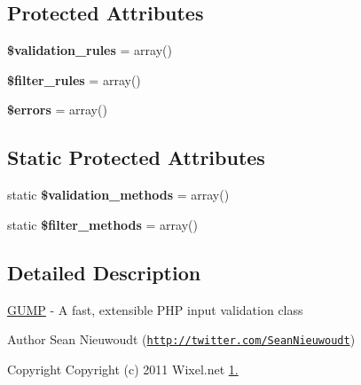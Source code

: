 \subsection*{Protected Attributes}
\begin{DoxyCompactItemize}
\item 
\hypertarget{class_g_u_m_p_abd46aadb9310cf380929cc59082e09c8}{{\bfseries \$validation\-\_\-rules} = array()}\label{class_g_u_m_p_abd46aadb9310cf380929cc59082e09c8}

\item 
\hypertarget{class_g_u_m_p_abaadef9a387318e61f818d346abc5f96}{{\bfseries \$filter\-\_\-rules} = array()}\label{class_g_u_m_p_abaadef9a387318e61f818d346abc5f96}

\item 
\hypertarget{class_g_u_m_p_ab24faf4aa647cdcee494fc48524ad4ff}{{\bfseries \$errors} = array()}\label{class_g_u_m_p_ab24faf4aa647cdcee494fc48524ad4ff}

\end{DoxyCompactItemize}
\subsection*{Static Protected Attributes}
\begin{DoxyCompactItemize}
\item 
\hypertarget{class_g_u_m_p_aa52e18a78acb26d7e319bc57c75ed60c}{static {\bfseries \$validation\-\_\-methods} = array()}\label{class_g_u_m_p_aa52e18a78acb26d7e319bc57c75ed60c}

\item 
\hypertarget{class_g_u_m_p_ab8407a187bf76a61832f6bcb11e3d8a7}{static {\bfseries \$filter\-\_\-methods} = array()}\label{class_g_u_m_p_ab8407a187bf76a61832f6bcb11e3d8a7}

\end{DoxyCompactItemize}


\subsection{Detailed Description}
\hyperlink{class_g_u_m_p}{G\-U\-M\-P} -\/ A fast, extensible P\-H\-P input validation class

\begin{DoxyAuthor}{Author}
Sean Nieuwoudt (\href{http://twitter.com/SeanNieuwoudt}{\tt http\-://twitter.\-com/\-Sean\-Nieuwoudt}) 
\end{DoxyAuthor}
\begin{DoxyCopyright}{Copyright}
Copyright (c) 2011 Wixel.\-net \hyperlink{}{1. }
\end{DoxyCopyright}


